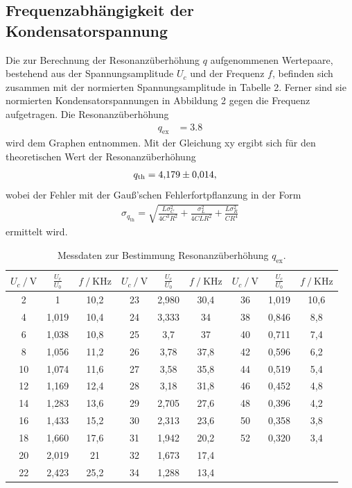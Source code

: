 \subsection{Frequenzabhängigkeit der Kondensatorspannung}
Die zur Berechnung der Resonanzüberhöhung $q$ aufgenommenen Wertepaare, bestehend aus der Spannungsamplitude $U_c$ und der Frequenz $f$, befinden sich zusammen mit der
normierten Spannungsamplitude in Tabelle 2. Ferner sind sie normierten Kondensatorspannungen in Abbildung 2 gegen die Frequenz aufgetragen.
Die Resonanzüberhöhung 
\begin{align*}
q_\text{ex} &= \num{3.8}
\end{align*}
wird dem Graphen entnommen. Mit der Gleichung xy ergibt sich für den theoretischen Wert der Resonanzüberhöhung 
\begin{align*}
q_\text{th} &= \num{4.179 +-0.014},
\end{align*}
wobei der Fehler mit der Gauß'schen Fehlerfortpflanzung in der Form
\begin{align*}
\sigma_{q_\text{th}} = \sqrt{\frac{L \sigma_{C}^{2}}{4C^{3} R^{2}} + \frac{\sigma_{L}^{2}}{4C L R^{2}} + \frac{L \sigma_{R}^{2}}{C R^{4}}}
\end{align*}
ermittelt wird.

\begin{table}
\centering
\caption{Messdaten zur Bestimmung Resonanzüberhöhung $q_\text{ex}$.}
\label{tab:some_data}
\begin{tabular}{c c c c c c c c c}
\toprule
$\mathit{U_c \: / \: \mathrm{V}}$ & $\frac{U_c}{U_0}$ & $\mathit{f \: / \: \mathrm{KHz}}$ & $\mathit{U_c \: / \: \mathrm{V}}$ & $\frac{U_c}{U_0}$ & $\mathit{f \: / \: \mathrm{KHz}}$ & $\mathit{U_c \: / \: \mathrm{V}}$ & $\frac{U_c}{U_0}$ & $\mathit{f \: / \: \mathrm{KHz}}$ \\
\midrule
2  & 1     & 10,2 & 23 & 2,980  & 30,4 & 36 & 1,019  & 10,6 \\
4  & 1,019  & 10,4 & 24 & 3,333  & 34 & 38 & 0,846  &  8,8 \\
6  & 1,038  & 10,8 & 25 & 3,7    & 37 & 40 & 0,711  &  7,4 \\
8  & 1,056  & 11,2 & 26 & 3,78   & 37,8 & 42 & 0,596  &  6,2 \\
10 & 1,074  & 11,6 & 27 & 3,58   & 35,8 & 44 & 0,519  &  5,4 \\
12 & 1,169  & 12,4 & 28 & 3,18   & 31,8 & 46 & 0,452  &  4,8 \\
14 & 1,283  & 13,6 & 29 & 2,705  & 27,6 & 48 & 0,396  &  4,2 \\
16 & 1,433  & 15,2 & 30 & 2,313  & 23,6 & 50 & 0,358  &  3,8 \\
18 & 1,660  & 17,6 & 31 & 1,942  & 20,2 & 52 & 0,320  &  3,4 \\
20 & 2,019  & 21 & 32 & 1,673  & 17,4 & & & \\
22 & 2,423  & 25,2 & 34 & 1,288  & 13,4 & & & \\
\bottomrule
\end{tabular}
\end{table}

